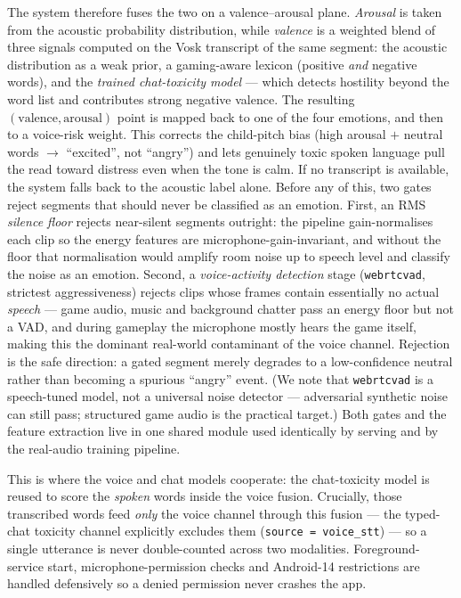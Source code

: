 \documentclass[11pt,a4paper]{article}
\begin{document}
The system therefore fuses the two on a valence--arousal plane. \emph{Arousal} is taken
from the acoustic probability distribution, while \emph{valence} is a weighted blend of
three signals computed on the Vosk transcript of the same segment: the acoustic
distribution as a weak prior, a gaming-aware lexicon (positive \emph{and} negative
words), and the \emph{trained chat-toxicity model} --- which detects hostility beyond the
word list and contributes strong negative valence. The resulting
$(\text{valence}, \text{arousal})$ point is mapped back to one of the four emotions, and
then to a voice-risk weight. This corrects the child-pitch bias (high arousal $+$ neutral
words $\rightarrow$ ``excited'', not ``angry'') and lets genuinely toxic spoken language
pull the read toward distress even when the tone is calm. If no transcript is available,
the system falls back to the acoustic label alone. Before any of this, two gates reject
segments that should never be classified as an emotion. First, an RMS \emph{silence
floor} rejects near-silent segments outright: the pipeline gain-normalises each clip so
the energy features are microphone-gain-invariant, and without the floor that
normalisation would amplify room noise up to speech level and classify the noise as an
emotion. Second, a \emph{voice-activity detection} stage (\texttt{webrtcvad}, strictest
aggressiveness) rejects clips whose frames contain essentially no actual \emph{speech}
--- game audio, music and background chatter pass an energy floor but not a VAD, and
during gameplay the microphone mostly hears the game itself, making this the dominant
real-world contaminant of the voice channel. Rejection is the safe direction: a gated
segment merely degrades to a low-confidence neutral rather than becoming a spurious
``angry'' event. (We note that \texttt{webrtcvad} is a speech-tuned model, not
a universal noise detector --- adversarial synthetic noise can still pass; structured
game audio is the practical target.) Both gates and the feature extraction live in one
shared module used identically by serving and by the real-audio training pipeline.

This is where the voice and chat models cooperate: the chat-toxicity model is reused to
score the \emph{spoken} words inside the voice fusion. Crucially, those transcribed words
feed \emph{only} the voice channel through this fusion --- the typed-chat toxicity
channel explicitly excludes them (\texttt{source = voice\_stt}) --- so a single utterance
is never double-counted across two modalities. Foreground-service start,
microphone-permission checks and Android-14 restrictions are handled defensively so a
denied permission never crashes the app.
\end{document}
